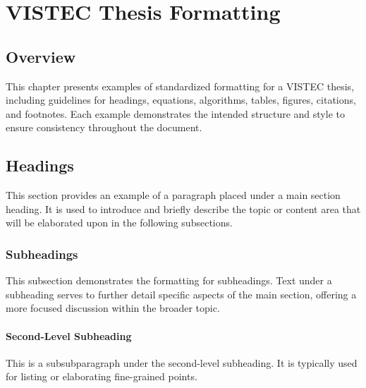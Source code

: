 \chapter{VISTEC Thesis Formatting}
\label{chapter4}

\section{Overview}
\begin{paragraph}
This chapter presents examples of standardized formatting for a VISTEC thesis, including guidelines for headings, equations, algorithms, tables, figures, citations, and footnotes. Each example demonstrates the intended structure and style to ensure consistency throughout the document.
\end{paragraph}

\section{Headings}
\begin{paragraph}
This section provides an example of a paragraph placed under a main section heading. It is used to introduce and briefly describe the topic or content area that will be elaborated upon in the following subsections.
\end{paragraph}

\subsection{Subheadings}
\begin{subparagraph}
This subsection demonstrates the formatting for subheadings. Text under a subheading serves to further detail specific aspects of the main section, offering a more focused discussion within the broader topic.
\end{subparagraph}


\subsubsection{Second-Level Subheading}
\begin{subsubparagraph}
This is a subsubparagraph under the second-level subheading. It is typically used for listing or elaborating fine-grained points.
\end{subsubparagraph}

